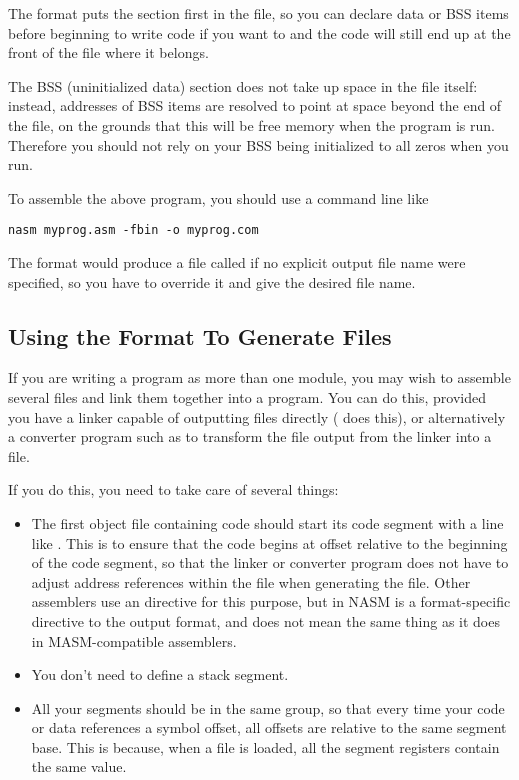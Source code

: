 The  format puts the  section first in the file,
so you can declare data or BSS items before beginning to write code if
you want to and the code will still end up at the front of the file
where it belongs.

The BSS (uninitialized data) section does not take up space in the
 file itself: instead, addresses of BSS items are resolved
to point at space beyond the end of the file, on the grounds that
this will be free memory when the program is run. Therefore you
should not rely on your BSS being initialized to all zeros when you
run.

To assemble the above program, you should use a command line like

\begin{lstlisting}
nasm myprog.asm -fbin -o myprog.com
\end{lstlisting}

The  format would produce a file called  if no
explicit output file name were specified, so you have to override it
and give the desired file name.

\subsection{Using the  Format To Generate  Files}
\label{subsec:comobjfmt}

If you are writing a  program as more than one module, you
may wish to assemble several  files and link them together
into a  program. You can do this, provided you have a linker
capable of outputting  files directly ( does this),
or alternatively a converter program such as  to
transform the  file output from the linker into a 
file.

If you do this, you need to take care of several things:

\begin{itemize}
    \item{The first object file containing code should start its code
        segment with a line like . This is to ensure
        that the code begins at offset  relative to the beginning
        of the code segment, so that the linker or converter program does
        not have to adjust address references within the file when generating
        the  file. Other assemblers use an  directive
        for this purpose, but  in NASM is a format-specific directive
        to the  output format, and does not mean the same thing as
        it does in MASM-compatible assemblers.}
    \item{You don't need to define a stack segment.}
    \item{All your segments should be in the same group, so that every time
        your code or data references a symbol offset, all offsets are
        relative to the same segment base. This is because, when a 
        file is loaded, all the segment registers contain the same value.}
\end{itemize}

